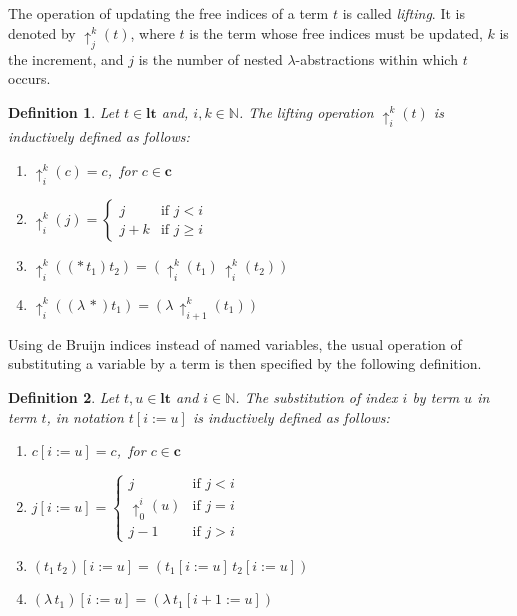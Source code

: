 \documentclass[submission,creativecommons]{eptcs}
\newtheorem{definition}{Definition}
\newcommand{\iabs}[1]{(\lambda\,#1)}
\newcommand{\iapp}[2]{(#1\,#2)}
\newcommand{\sbstt}[3]{#1[#2 := #3]}
\newcommand{\liftt}[3]{{\uparrow}^{#2}_{#3}(#1)}
\newcommand{\ltm}{\mathord{\mathbf{lt}}}
\newcommand{\cst}{\mathord{\mathbf{c}}}
\begin{document}
The operation of updating the free indices of a term $t$ is called \textit{lifting}.
It is denoted by $\liftt{t}{k}{j}$, where $t$ is the term whose free indices must be updated, $k$ is the increment,
and $j$ is the number of nested $\lambda$-abstractions within which $t$ occurs.


\begin{definition}
 Let $t \in \ltm$ and, $i, k \in \mathbb{N}$. The lifting operation $\liftt{t}{k}{i}$ is inductively defined as follows:
\begin{enumerate}[label={\rm \roman*.}, labelsep*=2ex, parsep=0pt, itemsep=3pt plus 1pt minus 1pt]
\item $\liftt{c}{k}{i} = c$,\, for $c\in\cst$
\item $\liftt{j}{k}{i} =
	\begin{cases}
	 j & \text{if $j < i$} \\
	 j + k & \text{if $j \geq i$}
	\end{cases}$
\label{lift:var}
\item $\liftt{\iapp*{t_1}{t_2}}{k}{i} = \iapp{\liftt{t_1}{k}{i}}{\liftt{t_2}{k}{i}}$
\item $\liftt{\iabs*{t_1}}{k}{i} = \iabs{\liftt{t_1}{k}{i + 1}}$
\end{enumerate}
\end{definition}

Using de Bruijn indices instead of named variables, the usual operation of substituting a variable by a term is then specified
by the following definition.

\begin{definition}
Let $t, u \in \ltm$ and $i \in \mathbb{N}$. The substitution of index $i$ by term $u$ in term $t$,
in notation $\sbstt{t}{i}{u}$ is inductively defined as follows:
\begin{enumerate}[label={\rm \roman*.}, labelsep*=2ex, itemsep=0pt]
  \item $\sbstt{c}{i}{u} = c$,\, for $c\in\cst$
  \item $\sbstt{j}{i}{u} =
    \begin{cases}
       j & \text{if $j < i$} \\
       \liftt{u}{i}{0} & \text{if $j = i$} \\
       j - 1 & \text{if $j > i$}
    \end{cases}$
    \label{subst:var}
  \item $\sbstt{\iapp{t_1}{t_2}}{i}{u} = \iapp{\sbstt{t_1}{i}{u}}{\sbstt{t_2}{i}{u}}$
  \item $\sbstt{\iabs{t_1}}{i}{u} = \iabs{\sbstt{t_1}{i+1}{u}}$
    \label{subst:abs}
\end{enumerate}
\end{definition}
\end{document}
